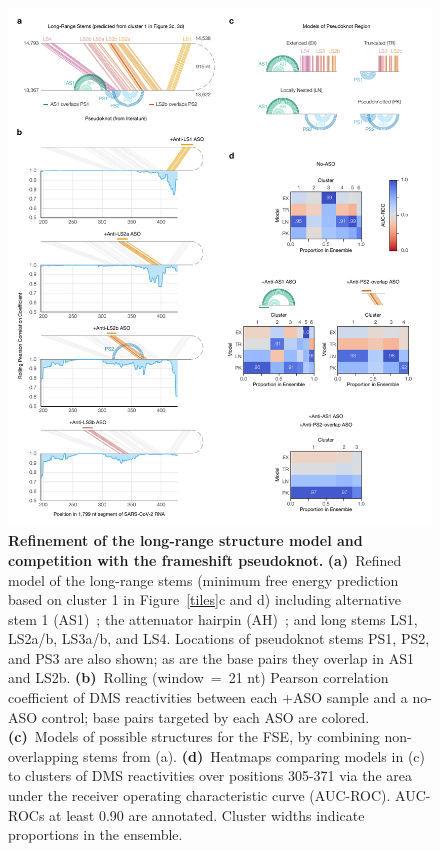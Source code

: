 \documentclass[main.tex]{subfiles}
\begin{document}
\begin{figure}[H]
	\includegraphics[width=\textwidth]{../MainFigures/lnas/lnas.pdf}
	\caption{\textbf{Refinement of the long-range structure model and competition with the frameshift pseudoknot.} \textbf{(a)}~Refined model of the long-range stems (minimum free energy prediction based on cluster 1 in Figure~\ref{tiles}c and d) including alternative stem 1 (AS1)~\cite{Lan2022}; the attenuator hairpin (AH)~\cite{Su2005}; and long stems LS1, LS2a/b, LS3a/b, and LS4. Locations of pseudoknot stems PS1, PS2, and PS3 are also shown; as are the base pairs they overlap in AS1 and LS2b. \textbf{(b)}~Rolling (window~=~21 nt) Pearson correlation coefficient of DMS reactivities between each +ASO sample and a no-ASO control; base pairs targeted by each ASO are colored. \textbf{(c)}~Models of possible structures for the FSE, by combining non-overlapping stems from (a). \textbf{(d)}~Heatmaps comparing models in (c) to clusters of DMS reactivities over positions 305-371 via the area under the receiver operating characteristic curve (AUC-ROC). AUC-ROCs at least 0.90 are annotated. Cluster widths indicate proportions in the ensemble.}
	\label{lnas}
\end{figure}
\end{document}
